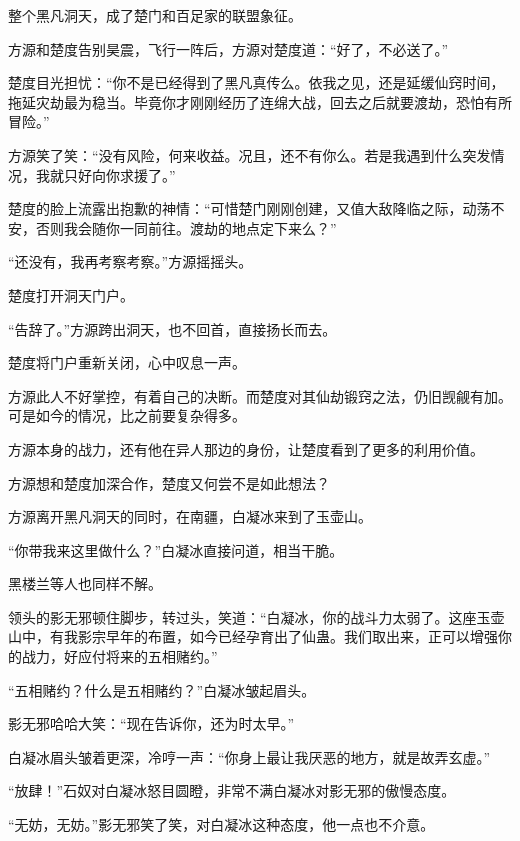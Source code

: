 \begin{this_body}
整个黑凡洞天，成了楚门和百足家的联盟象征。

方源和楚度告别昊震，飞行一阵后，方源对楚度道：“好了，不必送了。”

楚度目光担忧：“你不是已经得到了黑凡真传么。依我之见，还是延缓仙窍时间，拖延灾劫最为稳当。毕竟你才刚刚经历了连绵大战，回去之后就要渡劫，恐怕有所冒险。”

方源笑了笑：“没有风险，何来收益。况且，还不有你么。若是我遇到什么突发情况，我就只好向你求援了。”

楚度的脸上流露出抱歉的神情：“可惜楚门刚刚创建，又值大敌降临之际，动荡不安，否则我会随你一同前往。渡劫的地点定下来么？”

“还没有，我再考察考察。”方源摇摇头。

楚度打开洞天门户。

“告辞了。”方源跨出洞天，也不回首，直接扬长而去。

楚度将门户重新关闭，心中叹息一声。

方源此人不好掌控，有着自己的决断。而楚度对其仙劫锻窍之法，仍旧觊觎有加。可是如今的情况，比之前要复杂得多。

方源本身的战力，还有他在异人那边的身份，让楚度看到了更多的利用价值。

方源想和楚度加深合作，楚度又何尝不是如此想法？

方源离开黑凡洞天的同时，在南疆，白凝冰来到了玉壶山。

“你带我来这里做什么？”白凝冰直接问道，相当干脆。

黑楼兰等人也同样不解。

领头的影无邪顿住脚步，转过头，笑道：“白凝冰，你的战斗力太弱了。这座玉壶山中，有我影宗早年的布置，如今已经孕育出了仙蛊。我们取出来，正可以增强你的战力，好应付将来的五相赌约。”

“五相赌约？什么是五相赌约？”白凝冰皱起眉头。

影无邪哈哈大笑：“现在告诉你，还为时太早。”

白凝冰眉头皱着更深，冷哼一声：“你身上最让我厌恶的地方，就是故弄玄虚。”

“放肆！”石奴对白凝冰怒目圆瞪，非常不满白凝冰对影无邪的傲慢态度。

“无妨，无妨。”影无邪笑了笑，对白凝冰这种态度，他一点也不介意。

\end{this_body}

